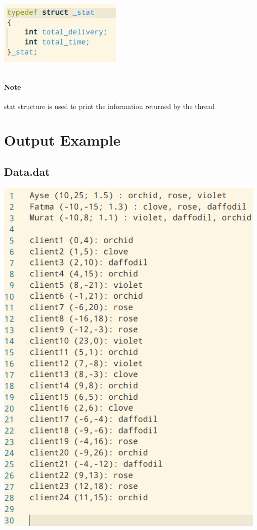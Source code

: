 \documentclass{article}
\begin{document}
\includegraphics[width=6cm, height=4cm]{v3.png}
\paragraph{Note}
stat structure is used to print the information returned by the thread

\section{Output Example}
    \subsection{Data.dat}
    \includegraphics{datadat.png}
    
\end{document}
